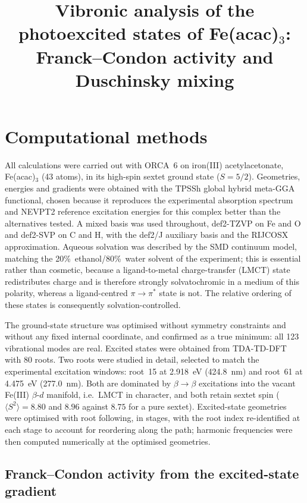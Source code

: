 \documentclass[11pt,a4paper]{article}
\title{Vibronic analysis of the photoexcited states of Fe(acac)$_3$:\\
Franck--Condon activity and Duschinsky mixing}
\author{}
\date{}
\begin{document}
\maketitle

\section{Computational methods}

All calculations were carried out with ORCA~6 on iron(III) acetylacetonate,
Fe(acac)$_3$ (43 atoms), in its high-spin sextet ground state ($S=5/2$).
Geometries, energies and gradients were obtained with the TPSSh global hybrid
meta-GGA functional, chosen because it reproduces the experimental absorption
spectrum and NEVPT2 reference excitation energies for this complex better than
the alternatives tested. A mixed basis was used throughout, def2-TZVP on Fe and
O and def2-SVP on C and H, with the def2/J auxiliary basis and the RIJCOSX
approximation. Aqueous solvation was described by the SMD continuum model,
matching the 20\%~ethanol/80\%~water solvent of the experiment; this is
essential rather than cosmetic, because a ligand-to-metal charge-transfer
(LMCT) state redistributes charge and is therefore strongly solvatochromic in
a medium of this polarity, whereas a ligand-centred $\pi\to\pi^{*}$ state is
not. The relative ordering of these states is consequently solvation-controlled.

The ground-state structure was optimised without symmetry constraints and
without any fixed internal coordinate, and confirmed as a true minimum: all
123 vibrational modes are real. Excited states were obtained from
TDA-TD-DFT with 80 roots. Two roots were studied in detail, selected to match
the experimental excitation windows: root~15 at \SI{2.918}{\electronvolt}
(\SI{424.8}{\nano\metre}) and root~61 at \SI{4.475}{\electronvolt}
(\SI{277.0}{\nano\metre}). Both are dominated by $\beta\to\beta$ excitations
into the vacant Fe(III) $\beta$-$d$ manifold, i.e.\ LMCT in character, and both
retain sextet spin ($\langle S^{2}\rangle = 8.80$ and $8.96$ against $8.75$ for
a pure sextet). Excited-state geometries were optimised with root following,
in stages, with the root index re-identified at each stage to account for
reordering along the path; harmonic frequencies were then computed numerically
at the optimised geometries.

\subsection*{Franck--Condon activity from the excited-state gradient}
\end{document}
